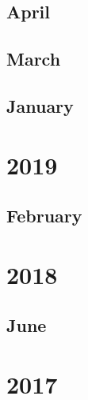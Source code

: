 \documentclass[12pt]{article}
\begin{document}
\subsection{April}
\begin{refsection}
    \nocite{chowdhery2022palmscalinglanguagemodeling}
    \nocite{wu_inference_2025}
    \printbibliography[heading=none]
\end{refsection}

\subsection{March}
\begin{refsection}
    \nocite{ouyang_training_2022}
    \printbibliography[heading=none]
\end{refsection}


\subsection{January}

\newpage
\section{2019}
\subsection{February}
\begin{refsection}
    \nocite{radford_language_2019}
    \printbibliography[heading=none]
\end{refsection}


\newpage
\section{2018}
\subsection{June}
\begin{refsection}
    \nocite{radford_improving_nodate}
    \printbibliography[heading=none]
\end{refsection}


\newpage
\section{2017}
\begin{refsection}
    \nocite{vaswani2023attentionneed}
    \printbibliography[heading=none]
\end{refsection}
\end{document}
